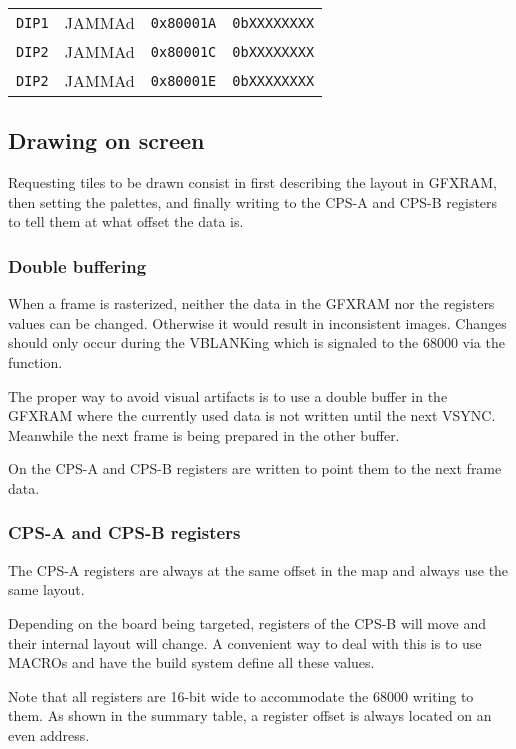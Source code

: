 \begin{tabularx}{\textwidth}{Xllr}
    \toprule   
    \texttt{DIP1} & JAMMAd &  \texttt{0x80001A}    &  \texttt{0bXXXXXXXX}    \\      
    \texttt{DIP2} & JAMMAd &  \texttt{0x80001C}    &  \texttt{0bXXXXXXXX}    \\      
    \texttt{DIP2} & JAMMAd &  \texttt{0x80001E}    &  \texttt{0bXXXXXXXX}    \\      
  \toprule   
\end{tabularx}

\subsection{Drawing on screen}
Requesting tiles to be drawn consist in first describing the layout in GFXRAM, then setting the palettes, and finally writing to the CPS-A and CPS-B registers to tell them at what offset the data is.

\subsubsection{Double buffering}
When a frame is rasterized, neither the data in the GFXRAM nor the registers values can be changed. Otherwise it would result in inconsistent images. Changes should only occur during the VBLANKing which is signaled to the 68000 via the  function.

The proper way to avoid visual artifacts is to use a double buffer in the GFXRAM where the currently used data is not written until the next VSYNC. Meanwhile the next frame is being prepared in the other buffer. 

On  the CPS-A and CPS-B registers are written to point them to the next frame data.

\subsubsection{CPS-A and CPS-B registers}
The CPS-A registers are always at the same offset in the map and always use the same layout. 

Depending on the board being targeted, registers of the CPS-B will move and their internal layout will change. A convenient way to deal with this is to use MACROs and have the build system define all these values.

Note that all registers are 16-bit wide to accommodate the 68000 writing to them. As shown in the summary table, a register offset is always located on an even address.

